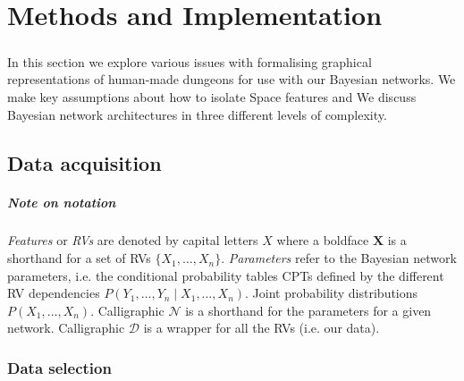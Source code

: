 \documentclass{UoYCSproject}
\begin{document}
\chapter{Methods and Implementation}

\paragraph{}
In this section we explore various issues with formalising graphical representations of human-made dungeons for use with our Bayesian networks. We make key assumptions about how to isolate Space features and 
We discuss Bayesian network architectures in three different levels of complexity.

\section{Data acquisition}

\paragraph{Note on notation}
\textit{Features} or \textit{RVs} are denoted by capital letters \(X\) where a boldface \(\boldsymbol{X}\) is a shorthand for a set of RVs \(\{X_1, \ldots, X_n\}\).
\textit{Parameters} refer to the Bayesian network parameters, i.e. the conditional probability tables CPTs defined by the different RV dependencies \(P(Y_1, \ldots, Y_n \mid X_1, \ldots , X_n)\).
Joint probability distributions \(P(X_1, \ldots , X_n)\).
Calligraphic \(\mathcal{N}\) is a shorthand for the parameters for a given network.
Calligraphic \(\mathcal{D}\) is a wrapper for all the RVs (i.e. our data).

\subsection{Data selection} %
\end{document}
